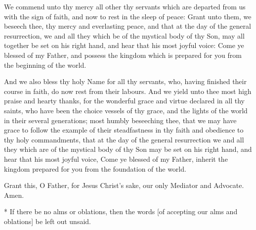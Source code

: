 {{\begin{multicols}{2}
We commend unto thy mercy all other thy servants which are departed from us with the sign of faith, and now to rest in the sleep of peace: Grant unto them, we beseech thee, thy mercy and everlasting peace, and that at the day of the general resurrection, we and all they which be of the mystical body of thy Son, may all together be set on his right hand, and hear that his most joyful voice: Come ye blessed of my Father, and possess the kingdom which is prepared for you from the beginning of the world.


And we also bless thy holy Name for all thy servants, who, having finished their course in faith, do now rest from their labours. And we yield unto thee most high praise and hearty thanks, for the wonderful grace and virtue declared in all thy saints, who have been the choice vessels of thy grace, and the lights of the world in their several generations; most humbly beseeching thee, that we may have grace to follow the example of their steadfastness in thy faith and obedience to thy holy commandments, that at the day of the general resurrection we and all they which are of the mystical body of thy Son may be set on his right hand, and hear that his most joyful voice, Come ye blessed of my Father, inherit the kingdom prepared for you from the foundation of the world.
\end{multicols}}
Grant this, O Father, for Jesus Christ's sake, our only Mediator and Advocate. \R Amen.}

* If there be no alms or oblations, then the words [of accepting our alms and oblations] be left out unsaid.


